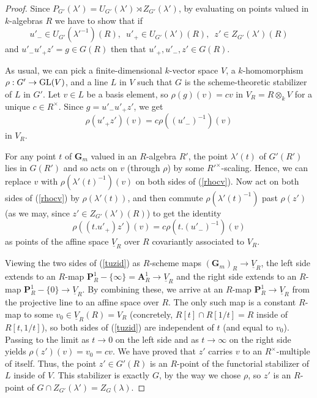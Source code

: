\documentclass[10pt]{article}
\renewcommand{\(}{\left(}
\renewcommand{\)}{\right)}
\numberwithin{thm}{subsection}
\begin{document}
\begin{proof}
Since $P_{G'}(\lambda') = U_{G'}(\lambda') \rtimes Z_{G'}(\lambda')$,
by evaluating on points valued in $k$-algebras $R$ we have to show that if
$$u'_{-} \in U_{G'}({\lambda'}^{-1})(R), \,\,\,
u'_{+} \in U_{G'}(\lambda')(R), \,\,\, z' \in Z_{G'}(\lambda')(R)$$ and 
$u'_{-}u'_{+} z'= g \in G(R)$ then 
that $u'_{+}, u'_{-}, z' \in G(R)$. 

As usual, we can pick a finite-dimensional $k$-vector space $V$,
a $k$-homomorphism $\rho:G' \rightarrow {\rm{GL}}(V)$, and a line
$L$ in $V$ such that $G$ is the scheme-theoretic stabilizer of $L$ in $G'$.  
Let $v \in L$ be a basis element, so $\rho(g)(v) = cv$ in $V_R = R \otimes_k V$ for a unique $c \in R^{\times}$.  
Since $g = u'_{-} u'_{+} z'$, we get 
\begin{equation}\label{rhocv}
\rho(u'_{+}z')(v) = c \rho((u'_{-})^{-1})(v)
\end{equation} 
in $V_R$.  

For any point $t$ of $\mathbf{G}_m$ valued in an $R$-algebra $R'$, the point 
$\lambda'(t)$ of $G'(R')$ lies in $G(R')$ 
and so acts on $v$ (through $\rho$) by some ${R'}^{\times}$-scaling.  Hence, we can replace
$v$ with $\rho(\lambda'(t)^{-1})(v)$ on both sides of (\ref{rhocv}).  
Now act on both sides
of (\ref{rhocv}) by $\rho(\lambda'(t))$, and then 
commute $\rho(\lambda'(t)^{-1})$ past $\rho(z')$ (as we may, since $z' \in Z_{G'}(\lambda')(R)$) to get the identity
\begin{equation}\label{tuzid}
\rho((t.u'_{+})z')(v) = c \rho(t.(u'_{-})^{-1})(v)
\end{equation} 
as points of the affine space $\underline{V}_R$ over $R$ covariantly associated to $V_R$.

Viewing the two sides of (\ref{tuzid}) as $R$-scheme maps $(\mathbf{G}_m)_{R} \rightarrow \underline{V}_{R}$,
the left side extends to an $R$-map $\mathbf{P}^1_R - \{\infty\} = \mathbf{A}^1_R \rightarrow 
\underline{V}_R$
and the right side extends to an $R$-map $\mathbf{P}^1_R - \{0\} \rightarrow \underline{V}_R$.  By 
combining these, we arrive at an $R$-map $\mathbf{P}^1_R \rightarrow \underline{V}_R$ from the projective
line to an affine space over $R$.  The only such map is a constant $R$-map to some $v_0 \in 
\underline{V}_R(R) = V_R$ (concretely, $R[t] \cap R[1/t] = R$ inside of $R[t,1/t]$), 
so both sides of (\ref{tuzid}) are independent of $t$ (and equal to $v_0$).  
Passing to the limit as $t \rightarrow 0$ on the left side and as $t \rightarrow \infty$ on the right side
yields $\rho(z')(v) = v_0 = c v$.    
We have proved that $z'$ carries $v$ to an $R^{\times}$-multiple
of itself.  Thus, the point $z' \in G'(R)$ is an $R$-point of the functorial stabilizer of $L$ inside of $V$.    
This stabilizer is
exactly $G$, by the way we chose $\rho$, so $z'$ is an $R$-point of $G \cap Z_{G'}(\lambda') = Z_G(\lambda)$. 


\end{proof}
\end{document}
